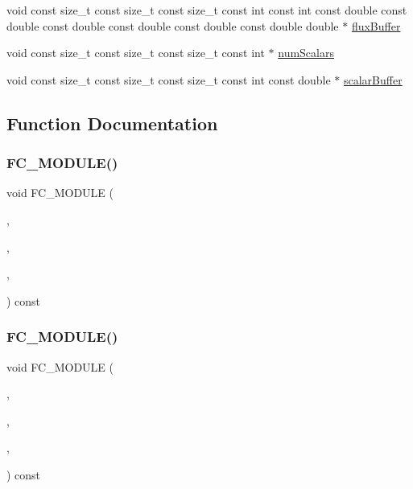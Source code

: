 \begin{DoxyCompactItemize}
\item 
void const size\+\_\+t const size\+\_\+t const size\+\_\+t const int const int const double const double const double const double const double const double double $\ast$ \hyperlink{EulerKernels_8H_a6cb12eed023c9e1d730140bde52292bf}{flux\+Buffer}
\item 
void const size\+\_\+t const size\+\_\+t const size\+\_\+t const int $\ast$ \hyperlink{EulerKernels_8H_a603fc2ed96fba20942f7b4dc59fa93bf}{num\+Scalars}
\item 
void const size\+\_\+t const size\+\_\+t const size\+\_\+t const int const double $\ast$ \hyperlink{EulerKernels_8H_aab1a00a65c2606add640aea91f141b7d}{scalar\+Buffer}
\end{DoxyCompactItemize}


\subsection{Function Documentation}
\hypertarget{EulerKernels_8H_a7812aa3c1b33953dbf982a92429213e8}{}\label{EulerKernels_8H_a7812aa3c1b33953dbf982a92429213e8} 
\subsubsection{\texorpdfstring{F\+C\+\_\+\+M\+O\+D\+U\+L\+E()}{FC\_MODULE()}\hspace{0.1cm}{\footnotesize\ttfamily [1/6]}}
{\footnotesize\ttfamily void F\+C\+\_\+\+M\+O\+D\+U\+LE (\begin{DoxyParamCaption}\item[{euler}]{,  }\item[{flux1d}]{,  }\item[{E\+U\+L\+ER}]{,  }\item[{F\+L\+U\+X1D}]{ }\end{DoxyParamCaption}) const}

\hypertarget{EulerKernels_8H_ab40e9a3a880a341a28756de4fca96e9e}{}\label{EulerKernels_8H_ab40e9a3a880a341a28756de4fca96e9e} 
\subsubsection{\texorpdfstring{F\+C\+\_\+\+M\+O\+D\+U\+L\+E()}{FC\_MODULE()}\hspace{0.1cm}{\footnotesize\ttfamily [2/6]}}
{\footnotesize\ttfamily void F\+C\+\_\+\+M\+O\+D\+U\+LE (\begin{DoxyParamCaption}\item[{euler}]{,  }\item[{scalarflux1d}]{,  }\item[{E\+U\+L\+ER}]{,  }\item[{S\+C\+A\+L\+A\+R\+F\+L\+U\+X1D}]{ }\end{DoxyParamCaption}) const}

